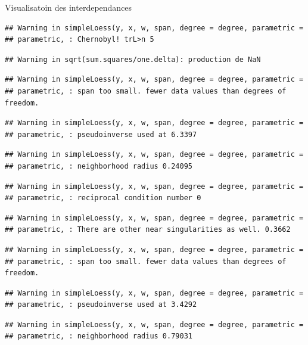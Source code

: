 \documentclass[11pt,ignorenonframetext,]{beamer}
\begin{document}
\begin{frame}[fragile]{Visualisatoin des interdependances}
\begin{verbatim}
## Warning in simpleLoess(y, x, w, span, degree = degree, parametric =
## parametric, : Chernobyl! trL>n 5
\end{verbatim}

\begin{verbatim}
## Warning in sqrt(sum.squares/one.delta): production de NaN
\end{verbatim}

\begin{verbatim}
## Warning in simpleLoess(y, x, w, span, degree = degree, parametric =
## parametric, : span too small. fewer data values than degrees of freedom.
\end{verbatim}

\begin{verbatim}
## Warning in simpleLoess(y, x, w, span, degree = degree, parametric =
## parametric, : pseudoinverse used at 6.3397
\end{verbatim}

\begin{verbatim}
## Warning in simpleLoess(y, x, w, span, degree = degree, parametric =
## parametric, : neighborhood radius 0.24095
\end{verbatim}

\begin{verbatim}
## Warning in simpleLoess(y, x, w, span, degree = degree, parametric =
## parametric, : reciprocal condition number 0
\end{verbatim}

\begin{verbatim}
## Warning in simpleLoess(y, x, w, span, degree = degree, parametric =
## parametric, : There are other near singularities as well. 0.3662
\end{verbatim}

\begin{verbatim}
## Warning in simpleLoess(y, x, w, span, degree = degree, parametric =
## parametric, : span too small. fewer data values than degrees of freedom.
\end{verbatim}

\begin{verbatim}
## Warning in simpleLoess(y, x, w, span, degree = degree, parametric =
## parametric, : pseudoinverse used at 3.4292
\end{verbatim}

\begin{verbatim}
## Warning in simpleLoess(y, x, w, span, degree = degree, parametric =
## parametric, : neighborhood radius 0.79031
\end{verbatim}


\end{frame}
\end{document}
